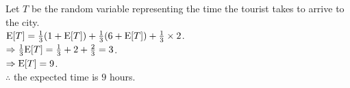 \begin{pr}
Let $T$ be the random variable representing the time the tourist takes to arrive to the city.\\
$\mathrm{E}[T]=\frac13(1+\mathrm{E}[T])+\frac13(6+\mathrm{E}[T])+\frac13\times2$.\\
$\Rightarrow\frac13\mathrm{E}[T]=\frac13+2+\frac23=3$.\\
$\Rightarrow\mathrm{E}[T]=9$.\\
$\therefore$ the expected time is $9$ hours.
\end{pr}
